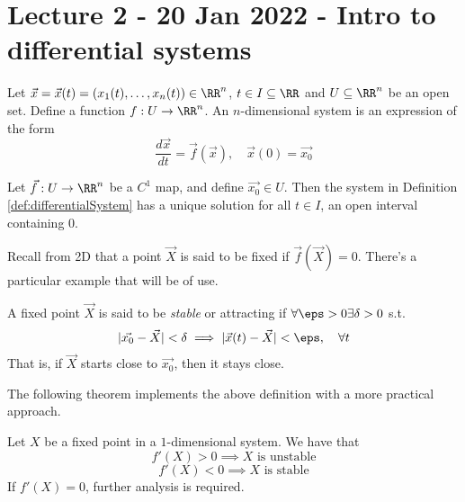 \section{Lecture 2 - 20 Jan 2022 - Intro to differential systems}
\begin{definition}
  Let $\vec{x}=\vec{x}(t)=(x_1(t),\dots, x_n(t))\in\RR^n$, $t\in I\subseteq
  \RR$ and $U\subseteq\RR^n$ be an open set. Define a function $f:U\to\RR^n$. An
  $n$-dimensional system is an expression of the form
  \[\frac{d\vec{x}}{dt} = \vec{f}(\vec{x}), \quad \vec{x}(0)=\vec{x_0}\]
  \label{def:differentialSystem}
\end{definition}
\begin{theorem}
  Let $\vec{f}:U\to\RR^n$ be a $C^1$ map, and define $\vec{x_0}\in U$. Then the
  system in Definition \ref{def:differentialSystem} has a unique solution for
  all $t\in I$, an open interval containing $0$.
\end{theorem}
Recall from 2D that a point $\vec{X}$ is said to be fixed if
$\vec{f}(\vec{X})=0$. There's a particular example that will be of use.
\begin{definition}
  A fixed point $\vec{X}$ is said to be \emph{stable} or attracting if $\forall
  \eps>0 \exists \delta>0$ s.t. 
  \[|\vec{x_0}-\vec{X}|< \delta \implies |\vec{x}(t)-\vec{X}| < \eps, \quad
  \forall t\]
  That is, if $\vec{X}$ starts close to $\vec{x_0}$, then it stays close.
\end{definition}
The following theorem implements the above definition with a more practical
approach.
\begin{theorem}
  Let $X$ be a fixed point in a $1$-dimensional system. We have that 
  \[f'(X) >0 \implies \text{$X$ is unstable}\]
  \[f'(X) <0 \implies \text{$X$ is stable}\]
  If $f'(X)=0$, further analysis is required.
  \label{thm:stability1D}
\end{theorem}

